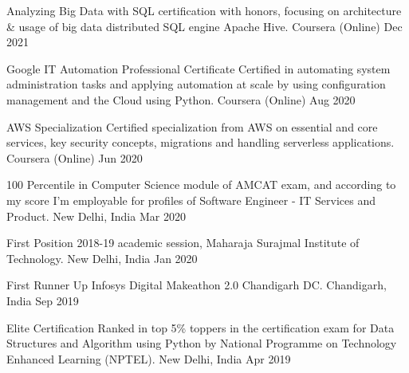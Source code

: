 



\begin{cvhonors}

  \cvhonor
    {Analyzing Big Data with SQL} %
    {certification with honors, focusing on architecture \& usage of big data distributed SQL engine Apache Hive.
} %
    {Coursera (Online)} %
    {Dec 2021} %

  \cvhonor
    {Google IT Automation Professional Certificate} %
    {Certified in automating system administration tasks and  applying automation at scale by using configuration management and the Cloud using Python.
} %
    {Coursera (Online)} %
    {Aug 2020} %

  \cvhonor
    {AWS Specialization} %
    {Certified specialization from AWS on essential and core services, key security concepts, migrations and handling serverless applications.
} %
    {Coursera (Online)} %
    {Jun 2020} %
    
  \cvhonor
    {100 Percentile} %
    {in Computer Science module of AMCAT exam, and according to my score I'm employable for profiles of Software Engineer - IT Services and Product.} %
    {New Delhi, India} %
    {Mar 2020} %

  \cvhonor
    {First Position} %
    {2018-19 academic session, Maharaja Surajmal Institute of Technology.} %
    {New Delhi, India} %
    {Jan 2020} %

  \cvhonor
    {First Runner Up} %
    {Infosys Digital Makeathon 2.0 Chandigarh DC.} %
    {Chandigarh, India} %
    {Sep 2019} %

  \cvhonor
    {Elite Certification} %
    {Ranked in top 5\% toppers in the certification exam for Data Structures and Algorithm using Python by National Programme on Technology Enhanced Learning (NPTEL).} %
    {New Delhi, India} %
    {Apr 2019} %

\end{cvhonors}
